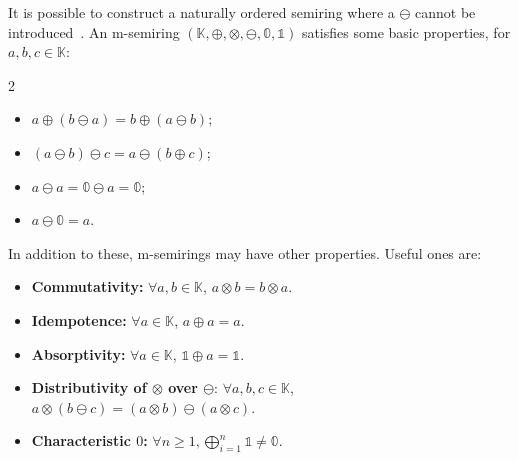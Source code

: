 It is possible to construct
a naturally ordered semiring where a $\ominus$ cannot be
introduced~\cite{amarilli2016example}.
An m-semiring $(\mathbb K, \oplus, \otimes, \ominus, \mathbb 0, \mathbb
1)$ satisfies some basic properties, for $a, b, c\in\mathbb K$:
\vspace*{-1em}
\begin{multicols}{2}
  \begin{itemize}
    \item {}
      $a\oplus(b\ominus a) = b\oplus(a\ominus b)$;
    \item {}
      $(a\ominus b)\ominus c = a\ominus(b\oplus c)$;
    \item {}
       $a\ominus a = \mathbb 0\ominus a=\mathbb 0$;
    \item {} $a\ominus \mathbb 0=a$.
  \end{itemize}
\end{multicols}
\vspace*{-1em}
\noindent In addition to these, m-semirings may have other properties. Useful ones are:
\begin{itemize}
  \item \textbf{Commutativity:} $\forall a,b\in \mathbb K$, $a\otimes b = b\otimes a$.
  \item \textbf{Idempotence:}  $\forall a\in \mathbb K$, $a\oplus a = a$.
  \item \textbf{Absorptivity:}  $\forall a\in \mathbb K$, $\mathbb 1 \oplus a = \mathbb 1$.
  \item \textbf{Distributivity of $\otimes$ over $\ominus$}:
     $\forall a,b,c\in
    \mathbb K$, $a\otimes (b\ominus c) = (a\otimes b) \ominus (a\otimes
    c)$.
  \item \textbf{Characteristic $0$:} \(\forall n\geq 1,
    \bigoplus_{i=1}^n\mathbb{1}\neq \mathbb{0}\).
\end{itemize}



